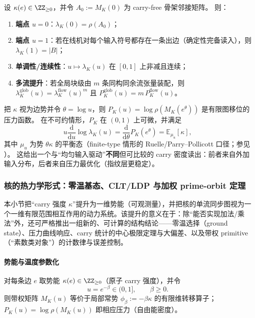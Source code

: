 \begin{proposition}[端点、单调性与多流提升]\label{prop:kernel-pressure-endpoints}
设 $\kappa(e)\in\ZZ_{\ge 0}$，并令 $A_0:=M_K(0)$ 为 carry-free 骨架邻接矩阵。
则：
\begin{enumerate}
  \item \textbf{端点 $u=0$}：$\lambda_K(0)=\rho(A_0)$；
  \item \textbf{端点 $u=1$}：若在线机对每个输入符号都存在一条出边（确定性完备读入），则 $\lambda_K(1)=|B|$；
  \item \textbf{单调性/连续性}：$u\mapsto \lambda_K(u)$ 在 $[0,1]$ 上非减且连续；
  \item \textbf{多流提升}：若全局块级由 $m$ 条同构同余流张量装配，则
  \(
  \lambda^{\mathrm{glob}}_K(u)=\lambda^{\mathrm{flow}}_K(u)^m
  \)
  且
  \(
  P^{\mathrm{glob}}_K(u)=m\,P^{\mathrm{flow}}_K(u)
  \)。
\end{enumerate}
\end{proposition}

\begin{remark}
把 $\kappa$ 视为边势并令 $\theta=\log u$，则 $P_K(u)=\log\rho(M_K(e^\theta))$ 是有限图移位的压力函数。
在不可约情形，$P_K$ 在 $(0,1)$ 上可微，并满足
\[
u\frac{\mathrm{d}}{\mathrm{d}u}\log\lambda_K(u)
=\frac{\mathrm{d}}{\mathrm{d}\theta}P_K(e^\theta)
=\mathbb{E}_{\mu_u}[\kappa],
\]
其中 $\mu_u$ 为势 $\theta\kappa$ 的平衡态（finite-type 情形的 Ruelle/Parry--Pollicott 口径；参见 \cite{Ruelle1978Thermodynamic,ParryPollicott1990Zeta}）。
这给出一个与“均匀输入驱动”\textbf{不同}但可比较的 carry 密度读出：前者来自外加输入分布，后者来自压力最优化（指纹层更稳定）。
\end{remark}

\subsubsection{核的热力学形式：零温基态、CLT/LDP 与加权 prime-orbit 定理}\label{subsec:kernel-thermo}
本小节把“carry 强度 $\kappa$”提升为一维势能（可观测量），并把核的单流同步图视为一个一维有限范围相互作用的动力系统。该提升的意义在于：除“能否实现加法/乘法”外，还可严格推出一组新的、可计算的结构结论——零温选择（ground state）、压力曲线响应、carry 统计的中心极限定理与大偏差、以及带权 primitive（“素数类对象”）的计数律与误差控制。

\paragraph{势能与温度参数化}
对每条边 $e$ 取势能 $\kappa(e)\in\ZZ_{\ge 0}$（原子 carry 强度），并令
\[
u=e^{-\beta}\in(0,1],\qquad \beta\ge 0.
\]
则带权矩阵 $M_K(u)$ 等价于局部常势 $\phi_\beta:=-\beta\kappa$ 的有限维转移算子；$P_K(u)=\log\rho(M_K(u))$ 即相应压力（自由能密度）。

